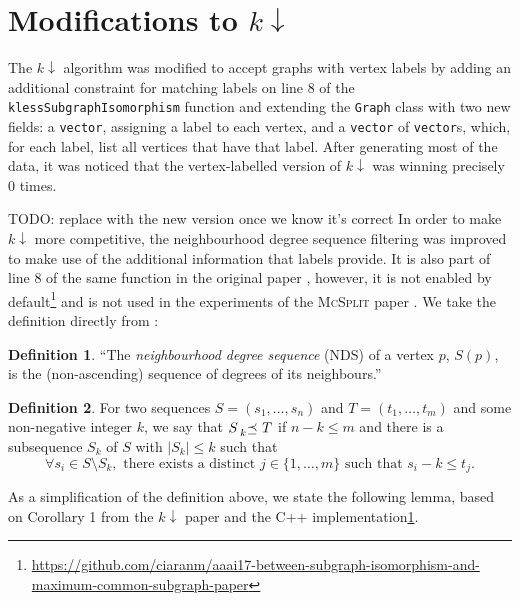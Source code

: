 \documentclass{l4proj}
\theoremstyle{definition}
\newtheorem{definition}{Definition}[chapter]
\theoremstyle{remark}
\newcommand{\kprec}[1]{\prescript{}{#1}{\preceq}\ }
\begin{document}
\section{Modifications to \texorpdfstring{$k\downarrow$}{kdown}}

The $k\downarrow$ algorithm was modified to accept graphs with vertex
labels by adding an additional constraint for matching labels on line 8 of the
\texttt{klessSubgraphIsomorphism} function \cite{DBLP:conf/aaai/HoffmannMR17}
and extending the \texttt{Graph} class with two new fields: a \texttt{vector},
assigning a label to each vertex, and a \texttt{vector} of \texttt{vector}s,
which, for each label, list all vertices that have that label. After generating
most of the data, it was noticed that the vertex-labelled version of
$k\downarrow$ was winning precisely 0 times.

TODO: replace with the new version once we know it's correct
In order to make $k\downarrow$ more competitive, the neighbourhood degree
sequence filtering was improved to make use of the additional information that
labels provide. It is also part of line 8 of the same function in the original
paper \cite{DBLP:conf/aaai/HoffmannMR17}, however, it is not enabled by
default\footnote{\label{foot:kdown}\url{https://github.com/ciaranm/aaai17-between-subgraph-isomorphism-and-maximum-common-subgraph-paper}}
and is not used in the experiments of the \textsc{McSplit} paper
\cite{DBLP:conf/ijcai/McCreeshPT17}. We take the definition directly from
\cite{DBLP:conf/aaai/HoffmannMR17}:

\begin{definition}
  ``The \emph{neighbourhood degree sequence} (NDS) of a vertex $p$, $S(p)$, is the
  (non-ascending) sequence of degrees of its neighbours.''
\end{definition}

\begin{definition} \label{def:prec}
  For two sequences $S = (s_1, \dots, s_n)$ and $T = (t_1, \dots, t_m)$ and some
  non-negative integer $k$, we say that $S \kprec{k} T$ if $n - k \le m$ and
  there is a subsequence $S_k$ of $S$ with $|S_k| \le k$ such that
  \cite{DBLP:conf/aaai/HoffmannMR17}
  \[ \forall s_i \in S \setminus S_k, \text{ there exists a distinct } j \in \{
    1, \dots, m \} \text{ such that } s_i - k \le t_j. \]
\end{definition}

As a simplification of the definition above, we state the following lemma, based
on Corollary 1 from the $k\downarrow$ paper
\cite{DBLP:conf/aaai/HoffmannMR17} and the C++ implementation\cref{foot:kdown}.
\end{document}
